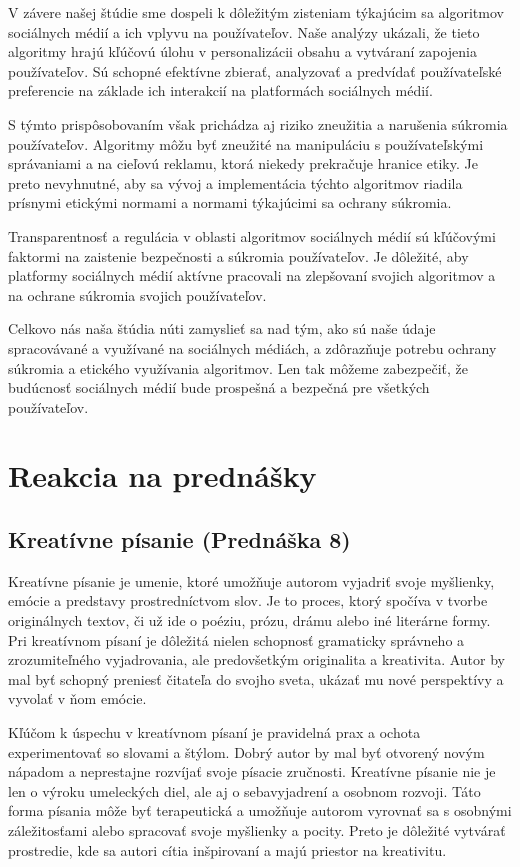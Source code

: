\documentclass[12pt,twoside,slovak,a4paper]{article}
\begin{document}
V závere našej štúdie sme dospeli k dôležitým zisteniam týkajúcim sa algoritmov sociálnych médií a ich vplyvu na používateľov. Naše analýzy ukázali, že tieto algoritmy hrajú kľúčovú úlohu v personalizácii obsahu a vytváraní zapojenia používateľov. Sú schopné efektívne zbierať, analyzovať a predvídať používateľské preferencie na základe ich interakcií na platformách sociálnych médií.

S týmto prispôsobovaním však prichádza aj riziko zneužitia a narušenia súkromia používateľov. Algoritmy môžu byť zneužité na manipuláciu s používateľskými správaniami a na cieľovú reklamu, ktorá niekedy prekračuje hranice etiky. Je preto nevyhnutné, aby sa vývoj a implementácia týchto algoritmov riadila prísnymi etickými normami a normami týkajúcimi sa ochrany súkromia.

Transparentnosť a regulácia v oblasti algoritmov sociálnych médií sú kľúčovými faktormi na zaistenie bezpečnosti a súkromia používateľov. Je dôležité, aby platformy sociálnych médií aktívne pracovali na zlepšovaní svojich algoritmov a na ochrane súkromia svojich používateľov.

Celkovo nás naša štúdia núti zamyslieť sa nad tým, ako sú naše údaje spracovávané a využívané na sociálnych médiách, a zdôrazňuje potrebu ochrany súkromia a etického využívania algoritmov. Len tak môžeme zabezpečiť, že budúcnosť sociálnych médií bude prospešná a bezpečná pre všetkých používateľov.




\section{Reakcia na prednášky}

\subsection{Kreatívne písanie (Prednáška 8)}

Kreatívne písanie je umenie, ktoré umožňuje autorom vyjadriť svoje myšlienky, emócie a predstavy prostredníctvom slov. Je to proces, ktorý spočíva v tvorbe originálnych textov, či už ide o poéziu, prózu, drámu alebo iné literárne formy. Pri kreatívnom písaní je dôležitá nielen schopnosť gramaticky správneho a zrozumiteľného vyjadrovania, ale predovšetkým originalita a kreativita. Autor by mal byť schopný preniesť čitateľa do svojho sveta, ukázať mu nové perspektívy a vyvolať v ňom emócie.

Kľúčom k úspechu v kreatívnom písaní je pravidelná prax a ochota experimentovať so slovami a štýlom. Dobrý autor by mal byť otvorený novým nápadom a neprestajne rozvíjať svoje písacie zručnosti. Kreatívne písanie nie je len o výroku umeleckých diel, ale aj o sebavyjadrení a osobnom rozvoji. Táto forma písania môže byť terapeutická a umožňuje autorom vyrovnať sa s osobnými záležitosťami alebo spracovať svoje myšlienky a pocity. Preto je dôležité vytvárať prostredie, kde sa autori cítia inšpirovaní a majú priestor na kreativitu.
\end{document}
